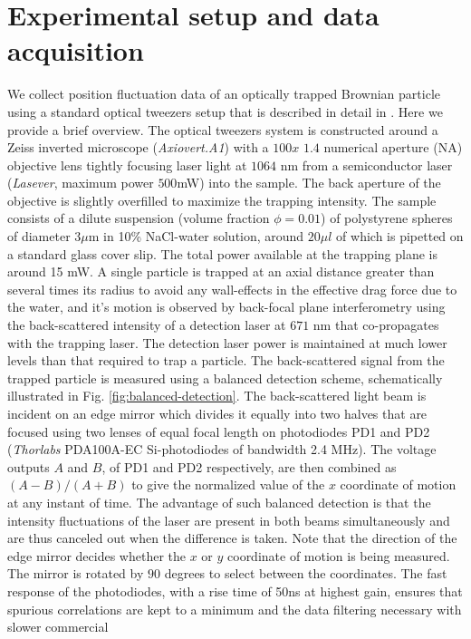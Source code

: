 \documentclass[fleqn,10pt]{wlscirep}
\begin{document}
\section*{Experimental setup and data acquisition}
We collect position
fluctuation data of an optically trapped Brownian particle using a
standard optical tweezers setup that is described in detail in \cite{rsi12}.
Here we provide a brief overview. The optical tweezers system is constructed
around a Zeiss inverted microscope (\emph{Axiovert.A1}) with a $100x$
$1.4$ numerical aperture (NA) objective lens tightly focusing laser
light at $1064$ nm from a semiconductor laser (\emph{Lasever}, maximum
power $500$mW) into the sample. The back aperture of the objective
is slightly overfilled to maximize the trapping intensity. The sample
consists of a dilute suspension (volume fraction $\phi=0.01$) of
polystyrene spheres of diameter $3\mu$m in 10\% NaCl-water solution,
around $20\mu l$ of which is pipetted on a standard glass cover slip.
The total power available at the trapping plane is around 15 mW. A
single particle is trapped at an axial distance greater than several
times its radius to avoid any wall-effects in the effective drag force
due to the water, and it's motion is observed by back-focal plane
interferometry using the back-scattered intensity of a detection laser
at $671$ nm that co-propagates with the trapping laser. The detection
laser power is maintained at much lower levels than that required
to trap a particle. The back-scattered signal from the trapped particle
is measured using a balanced detection scheme, schematically illustrated
in Fig. \ref{fig:balanced-detection}. The back-scattered light beam
is incident on an edge mirror which divides it equally into two halves
that are focused using two lenses of equal focal length on photodiodes
PD1 and PD2 (\emph{Thorlabs} PDA100A-EC Si-photodiodes of bandwidth
2.4 MHz). The voltage outputs $A$ and $B$, of PD1 and PD2 respectively,
are then combined as $(A-B)/(A+B)$ to give the normalized value of
the $x$ coordinate of motion at any instant of time. The advantage
of such balanced detection is that the intensity fluctuations of the
laser are present in both beams simultaneously and are thus canceled
out when the difference is taken. Note that the direction of the edge
mirror decides whether the $x$ or $y$ coordinate of motion is being
measured. The mirror is rotated by $90$ degrees to select between
the coordinates. The fast response of the photodiodes, with a rise
time of 50ns at highest gain, ensures that spurious correlations are
kept to a minimum and the data filtering necessary with slower commercial
\end{document}
